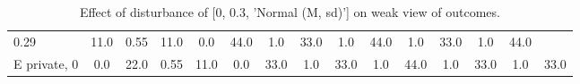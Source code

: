 \begin{table}
\begin{tabular}{l|cc|cc|cc|cc|cc|cc|cc}
\cellcolor{Bittersweet}0.29&\cellcolor{Bittersweet}11.0&\cellcolor{Bittersweet}0.55&\cellcolor{Bittersweet}11.0&\cellcolor{Bittersweet}0.0&\cellcolor{Bittersweet}44.0&\cellcolor{Bittersweet}1.0&\cellcolor{Bittersweet}33.0&\cellcolor{Bittersweet}1.0&\cellcolor{Bittersweet}44.0&\cellcolor{Bittersweet}1.0&\cellcolor{Bittersweet}33.0&\cellcolor{Bittersweet}1.0&\cellcolor{Bittersweet}44.0\\E private, 0 & \cellcolor{Bittersweet}0.0&\cellcolor{Bittersweet}22.0&\cellcolor{Bittersweet}0.55&\cellcolor{Bittersweet}11.0&\cellcolor{Bittersweet}0.0&\cellcolor{Bittersweet}33.0&\cellcolor{Bittersweet}1.0&\cellcolor{Bittersweet}33.0&\cellcolor{Bittersweet}1.0&\cellcolor{Bittersweet}44.0&\cellcolor{Bittersweet}1.0&\cellcolor{Bittersweet}33.0&\cellcolor{Bittersweet}1.0&\cellcolor{Bittersweet}33.0\\\bottomrule\end{tabular}\caption{Effect of disturbance of [0, 0.3, 'Normal (M, sd)'] on weak view of outcomes.}\end{table}